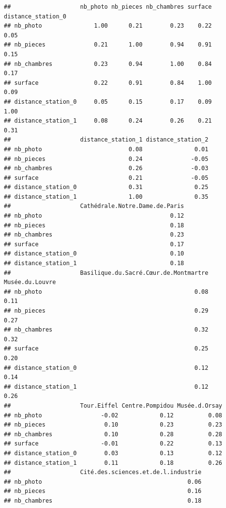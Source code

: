 \documentclass[french,]{article}
\begin{document}
\begin{verbatim}
##                    nb_photo nb_pieces nb_chambres surface distance_station_0
## nb_photo               1.00      0.21        0.23    0.22               0.05
## nb_pieces              0.21      1.00        0.94    0.91               0.15
## nb_chambres            0.23      0.94        1.00    0.84               0.17
## surface                0.22      0.91        0.84    1.00               0.09
## distance_station_0     0.05      0.15        0.17    0.09               1.00
## distance_station_1     0.08      0.24        0.26    0.21               0.31
##                    distance_station_1 distance_station_2
## nb_photo                         0.08               0.01
## nb_pieces                        0.24              -0.05
## nb_chambres                      0.26              -0.03
## surface                          0.21              -0.05
## distance_station_0               0.31               0.25
## distance_station_1               1.00               0.35
##                    Cathédrale.Notre.Dame.de.Paris
## nb_photo                                     0.12
## nb_pieces                                    0.18
## nb_chambres                                  0.23
## surface                                      0.17
## distance_station_0                           0.10
## distance_station_1                           0.18
##                    Basilique.du.Sacré.Cœur.de.Montmartre Musée.du.Louvre
## nb_photo                                            0.08            0.11
## nb_pieces                                           0.29            0.27
## nb_chambres                                         0.32            0.32
## surface                                             0.25            0.20
## distance_station_0                                  0.12            0.14
## distance_station_1                                  0.12            0.26
##                    Tour.Eiffel Centre.Pompidou Musée.d.Orsay
## nb_photo                 -0.02            0.12          0.08
## nb_pieces                 0.10            0.23          0.23
## nb_chambres               0.10            0.28          0.28
## surface                  -0.01            0.22          0.13
## distance_station_0        0.03            0.13          0.12
## distance_station_1        0.11            0.18          0.26
##                    Cité.des.sciences.et.de.l.industrie
## nb_photo                                          0.06
## nb_pieces                                         0.16
## nb_chambres                                       0.18

\end{verbatim}
\end{document}
